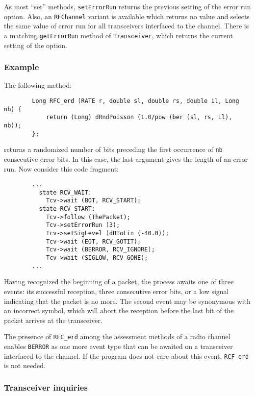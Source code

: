 As most ``set'' methods, {\tt setErrorRun} returns the previous setting of
the error run option.
Also, an {\tt RFChannel} variant is available which returns no value and
selects the same value of error run
for all transceivers interfaced to the channel.
There is a matching {\tt getErrorRun} method of {\tt Transceiver}, which
returns the current setting of the option.

\subsubsection*{Example}

The following method:

\begin{verbatim}
        Long RFC_erd (RATE r, double sl, double rs, double il, Long nb) {
            return (Long) dRndPoisson (1.0/pow (ber (sl, rs, il), nb));
        };
\end{verbatim}
returns a randomized number of bits preceding the first occurrence of {\tt nb}
consecutive error bits.
In this case, the last argument gives the length of an error run.
Now consider this code fragment:

\begin{verbatim}
        ...
          state RCV_WAIT:
            Tcv->wait (BOT, RCV_START);
          state RCV_START:
            Tcv->follow (ThePacket);
            Tcv->setErrorRun (3);
            Tcv->setSigLevel (dBToLin (-40.0));
            Tcv->wait (EOT, RCV_GOTIT);
            Tcv->wait (BERROR, RCV_IGNORE);
            Tcv->wait (SIGLOW, RCV_GONE);
        ...
\end{verbatim}

Having recognized the beginning of a packet, the process awaits one of three
events: its successful reception, three consecutive error bits, or a low
signal indicating that the packet is no more.
The second event may be synonymous with an incorrect symbol, which will
abort the reception before the last bit of the packet arrives at the
transceiver.

\medskip

The presence of {\tt RFC\_erd} among the assessment methods of a radio
channel enables {\tt BERROR} as one more event type that can be awaited on
a transceiver interfaced to the channel.
If the program does not care about this event, {\tt RCF\_erd} is not needed.

\subsubsection{Transceiver inquiries}
\label{rm_tr_pp_ti}

